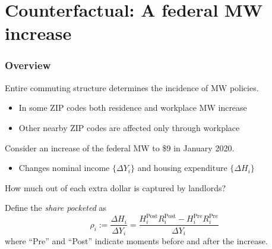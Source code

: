 \documentclass[aspectratio=169, t]{beamer}
\newcommand{\pre}{\text{Pre}}
\newcommand{\post}{\text{Post}}
\begin{document}
\section{Counterfactual: A federal MW increase}

\begin{frame}
    \frametitle{Overview}
    
    Entire commuting structure determines the incidence of MW policies.
    \begin{itemize}
        \vspace{1mm}
        \item In some ZIP codes both residence and workplace MW increase
        \vspace{1mm}
        \item Other nearby ZIP codes are affected only through workplace
    \end{itemize}
    
    \pause
    \vspace{3mm}
    Consider an increase of the federal MW to \$9 in January 2020.
    \begin{itemize}
        \vspace{1mm}
        \item Changes nominal income $\{\Delta Y_i\}$ and housing expenditure $\{\Delta H_i\}$
    \end{itemize}
    
    \vspace{2mm}
    How much out of each extra dollar is captured by landlords?
    \pause 

    \vspace{2mm}
    Define the \textit{share pocketed} as 
    \begin{equation*}
        \rho_i := \frac{\Delta H_i}{\Delta Y_i} =  \frac{H^{\post}_i R^{\post}_i - H^{\pre}_i R^{\pre}_i}{\Delta Y_i}
    \end{equation*}
    where ``Pre'' and ``Post'' indicate moments before and after the increase.
   
\end{frame}
\end{document}
